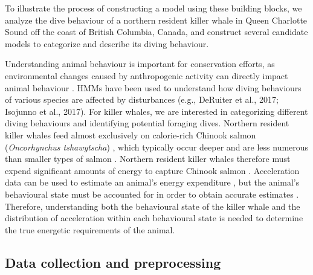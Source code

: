 

To illustrate the process of constructing a model using these building blocks, we analyze the dive behaviour of a northern resident killer whale in Queen Charlotte Sound off the coast of British Columbia, Canada, and construct several candidate models to categorize and describe its diving behaviour.

Understanding animal behaviour is important for conservation efforts, as environmental changes caused by anthropogenic activity can directly impact animal behaviour \citep{Sutherland:1998}. HMMs have been used to understand how diving behaviours of various species are affected by disturbances (e.g., DeRuiter et al., 2017; Isojunno et al., 2017)\nocite{DeRuiter:2017,Isojunno:2017}. For killer whales, we are interested in categorizing different diving behaviours and identifying potential foraging dives. Northern resident killer whales feed almost exclusively on calorie-rich Chinook salmon (\textit{Oncorhynchus tshawytscha}) \citep{Ford:2006}, which typically occur deeper and are less numerous than smaller types of salmon \citep{Ford:2009}. Northern resident killer whales therefore must expend significant amounts of energy to capture Chinook salmon \citep{Williams:2009,Noren:2011,Wright:2017}. 
Acceleration data can be used to estimate an animal's energy expenditure \citep{Green:2009,Wilson:2019}, but the animal's behavioural state must be accounted for in order to obtain accurate estimates \citep{Dot:2016}. Therefore, understanding both the behavioural state of the killer whale and the distribution of acceleration within each behavioural state is needed to determine the true energetic requirements of the animal.

\subsection{Data collection and preprocessing}

